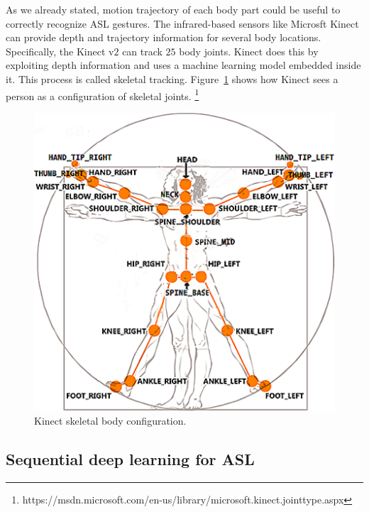 \documentclass[10pt,twocolumn,letterpaper]{article}
\begin{document}
As we already stated, motion trajectory of each body part could be useful to correctly recognize ASL gestures. The infrared-based sensors like 
Microsft Kinect can provide depth and trajectory information 
for several body locations. 
Specifically, the Kinect v$2$ can 
track $25$ body joints. Kinect does this by exploiting 
depth information and uses 
a machine learning model embedded inside it. 
%
This process is called skeletal tracking. Figure~\ref{fig:kinect_sk} shows
how Kinect sees a person as a configuration of skeletal 
joints. \footnote{https://msdn.microsoft.com/en-us/library/microsoft.kinect.jointtype.aspx} 
\begin{figure}[h]
	\begin{center}
		\includegraphics[width=.8\linewidth]{kinect_sk}
	\end{center}
	\caption{Kinect skeletal body configuration.}
	\label{fig:kinect_sk}
\end{figure}



\subsection{Sequential deep learning for ASL}
\end{document}

